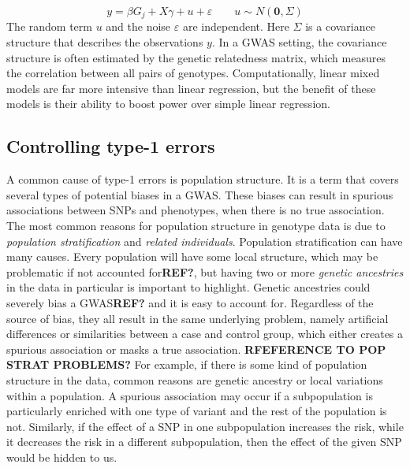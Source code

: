 \begin{equation}\label{eq:baseMixedModelGWAS}
y = \beta G_{j} +  X\gamma + u + \varepsilon \qquad u \sim N(\mathbf{0}, \Sigma)
\end{equation}
The random term $ u $ and the noise $ \varepsilon $ are independent. Here $ \Sigma $ is a covariance structure that describes the observations $ y $. In a GWAS setting, the covariance structure is often estimated by the genetic relatedness matrix, which measures the correlation between all pairs of genotypes. Computationally, linear mixed models are far more intensive than linear regression, but the benefit of these models is their ability to boost power over simple linear regression.


\subsection{Controlling type-1 errors}
A common cause of type-1 errors is population structure. It is a term that covers several types of potential biases in a GWAS. These biases can result in spurious associations between SNPs and phenotypes, when there is no true association. The most common reasons for population structure in genotype data is due to \textit{population stratification} and \textit{related individuals}. Population stratification can have many causes. Every population will have some local structure, which may be problematic if not accounted for\textbf{REF?}, but having two or more \textit{genetic ancestries} in the data in particular is important to highlight. Genetic ancestries could severely bias a GWAS\textbf{REF?} and it is easy to account for. Regardless of the source of bias, they all result in the same underlying problem, namely artificial differences or similarities between a case and control group, which either creates a spurious association or masks a true association. \textbf{RFEFERENCE TO POP STRAT PROBLEMS?}
For example, if there is some kind of population structure in the data, common reasons are genetic ancestry or local variations within a population. A spurious association may occur if a subpopulation is particularly enriched with one type of variant and the rest of the population is not. Similarly, if the effect of a SNP in one subpopulation increases the risk, while it decreases the risk in a different subpopulation, then the effect of the given SNP would be hidden to us.

